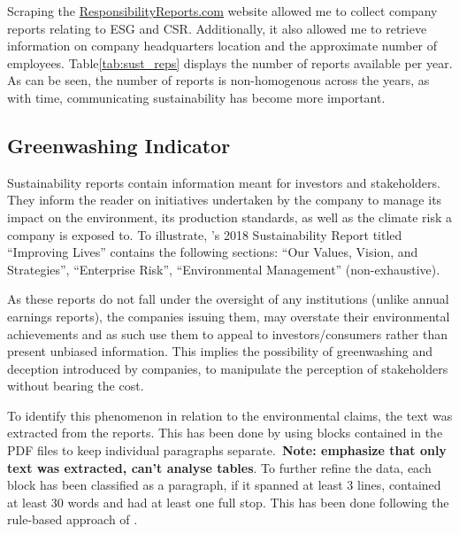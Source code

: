 \documentclass[12pt]{article}
\begin{document}
Scraping the \href{https://responsibilityreports.com}{ResponsibilityReports.com} website allowed me to collect company reports relating to ESG and CSR\@. Additionally, it also allowed me to retrieve information on company headquarters location and the approximate number of employees. Table\ref{tab:sust_reps} displays the number of reports available per year. As can be seen, the number of reports is non-homogenous across the years, as with time, communicating sustainability has become more important. 
    
    
\subsection{Greenwashing Indicator}

Sustainability reports contain information meant for investors and stakeholders. They inform the reader on initiatives undertaken by the company to manage its impact on the environment, its production standards, as well as the climate risk a company is exposed to. To illustrate, \citeauthor{3m2018sustainability}'s 2018 Sustainability Report titled ``Improving Lives'' contains the following sections:  ``Our Values, Vision, and 
Strategies'', ``Enterprise Risk'', ``Environmental Management'' (non-exhaustive). 

As these reports do not fall under the oversight of any institutions (unlike annual earnings reports), the companies issuing them, may overstate their environmental achievements and as such use them to appeal to investors/consumers rather than present unbiased information. This implies the possibility of greenwashing and deception introduced by companies, to manipulate the perception of stakeholders without bearing the cost. 

To identify this phenomenon in relation to the environmental claims, the text was extracted from the reports. This has been done by using blocks contained in the PDF files to keep individual paragraphs separate.\ \textbf{Note: emphasize that only text was extracted, can't analyse tables}. To further refine the data, each block has been classified as a paragraph, if it spanned at least 3 lines, contained at least 30 words and had at least one full stop. This has been done following the rule-based approach of \parencite{bingler_how_2024}. 
\end{document}
